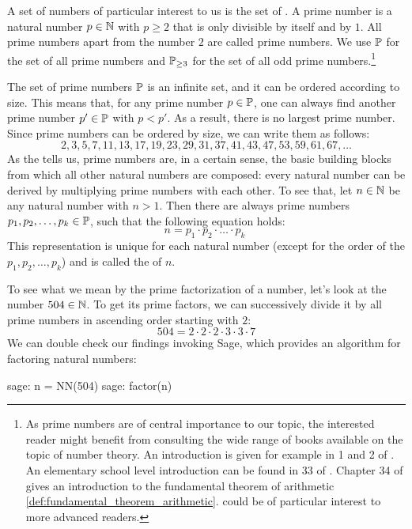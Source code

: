 A set of numbers of particular interest to us is the set of . A prime number is a natural number $ p \in \mathbb{N} $ with $ p \geq 2 $ that is only divisible by itself and by $1$. All prime numbers apart from the number $ 2 $ are called  prime numbers. We use $ \mathbb{P} $ for the set of all prime numbers and $ \mathbb{P} _{\geq 3} $ for the set of all odd prime numbers.\footnote{As prime numbers are of central importance to our topic, the interested reader might benefit from consulting the wide range of books available on the topic of number theory. An introduction is given for example in  \chaptname{} 1 and 2 of \cite{hardy-2008}. An elementary school level introduction can be found in  \chaptname{} 33 of \cite{wu-1}. Chapter 34 of \cite{wu-1} gives an introduction to the fundamental theorem of arithmetic \eqref{def:fundamental_theorem_arithmetic}. \cite{fine-2016} could be of particular interest to more advanced readers.}

The set of prime numbers $\mathbb{P}$ is an infinite set, and it can be ordered according to size. This means that, for any prime number $p\in\mathbb{P}$, one can always find another prime number $p'\in\mathbb{P}$ with $p<p'$. As a result, there is no largest prime number. Since prime numbers can be ordered by size, we can write them as follows:
\begin{equation}
\label{eq: primenumber_sequence}
2, 3, 5, 7, 11, 13, 17, 19, 23, 29, 31, 37, 41, 43, 47, 53, 59, 61, 67, \ldots
\end{equation}
As the  tells us, prime numbers are, in a certain sense, the basic building blocks from which all other natural numbers are composed: every natural number can be derived by multiplying prime numbers with each other. To see that, let $ n \in \mathbb{N} $ be any natural number with $n>1$. Then there are always prime numbers $ p_1, p_2, \ldots, p_k \in \mathbb{P} $, such that the following equation holds:
\begin{equation}
\label{def:fundamental_theorem_arithmetic}
n = p_1 \cdot p_2 \cdot \ldots \cdot p_k \;
\end{equation}
This representation is unique for each natural number (except for the order of the  $ p_1, p_2, \ldots, p_k$) and is called the  of $n$.

\begin{example}\label{ex-prime-factorization} To see what we mean by the prime factorization of a number, let's look at the number $504\in\mathbb{N}$. To get its prime factors, we can successively divide it by all prime numbers in ascending order starting with $2$:
\begin{equation*}
504 = 2\cdot 2\cdot 2\cdot 3\cdot 3\cdot 7
\end{equation*}
We can double check our findings invoking  Sage, which provides an algorithm for factoring natural numbers:
\begin{sagecommandline}
sage: n = NN(504)
sage: factor(n)
\end{sagecommandline}
\end{example}

